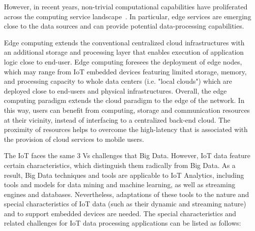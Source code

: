 However, in recent years, non-trivial computational capabilities have proliferated across the computing service landscape~\cite{continuum}. In particular, edge services are emerging close to the data sources and can provide potential data-processing capabilities\cite{dastjerdi2016fog,bonomi2014fog}. 

Edge computing extends the conventional centralized cloud infrastructures with an
additional storage and processing layer that enables execution of application logic close to end-user. Edge computing foresees the deployment of edge nodes, which may range from IoT embedded devices featuring limited storage, memory, and processing capacity to whole data centers (i.e. "local clouds") which are deployed close to end-users and physical infrastructures. Overall, the edge computing paradigm extends the cloud paradigm to the edge of the network. In this way, users can benefit from computing, storage and communication resources at their vicinity, instead of interfacing to a centralized back-end cloud. The proximity of resources helps to overcome the high-latency that is associated with the provision of cloud services to mobile users.

The IoT faces the same 3 Vs challenges that Big Data. However, IoT data feature certain characteristics, which distinguish them radically from Big Data. As a result, Big Data techniques and tools are applicable to IoT Analytics, including tools and models for data mining and machine learning, as well as streaming engines and databases. Nevertheless, adaptations of these tools to the nature and special characteristics of IoT data (such as their dynamic and streaming nature) and to support embedded devices are needed. The special characteristics and related challenges for IoT data processing applications can be listed as follows:

